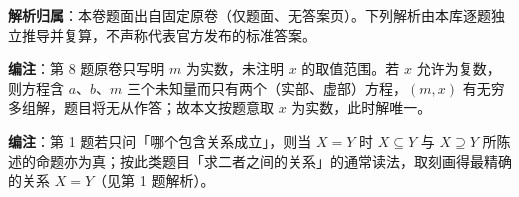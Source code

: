 

\begin{gknotice}
\textbf{解析归属}：本卷题面出自固定原卷（仅题面、无答案页）。下列解析由本库逐题独立推导并复算，不声称代表官方发布的标准答案。

\textbf{编注}：第 8 题原卷只写明 $m$ 为实数，未注明 $x$ 的取值范围。若 $x$ 允许为复数，则方程含 $a$、$b$、$m$ 三个未知量而只有两个（实部、虚部）方程，$(m,x)$ 有无穷多组解，题目将无从作答；故本文按题意取 $x$ 为实数，此时解唯一。

\textbf{编注}：第 1 题若只问「哪个包含关系成立」，则当 $X=Y$ 时 $X\subseteq Y$ 与 $X\supseteq Y$ 所陈述的命题亦为真；按此类题目「求二者之间的关系」的通常读法，取刻画得最精确的关系 $X=Y$（见第 1 题解析）。
\end{gknotice}


